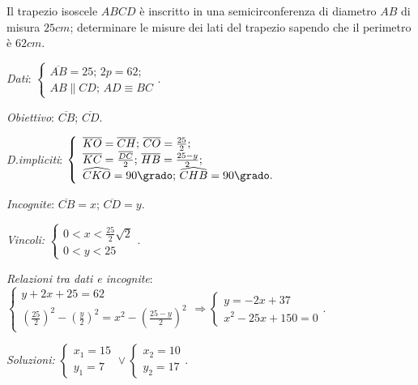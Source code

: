 \begin{problema}
Il trapezio isoscele $ABCD$ è inscritto in una semicirconferenza di diametro $AB$ di misura $25\unit{cm}$; determinare le misure dei lati del trapezio sapendo che il perimetro è $62\unit{cm}$.
\end{problema}
\begin{multicols}{2}
\emph{Dati}: $\left\{\begin{array}{l}\overline{AB}=25\text{; }2p=62;\\
AB\parallel CD\text{; }AD\equiv BC\end{array}\right.$.

\emph{Obiettivo}: $\overline{CB}$; $\overline{CD}$.

\emph{D.impliciti}: $\left\{\begin{array}{l}
\overline{KO}=\overline{CH}\text{; }\overline{CO}=\frac{25} 2;\\ \overline{KC}=\frac{\overline{DC}} 2\text{; }\overline{HB}=\frac{25-y} 2;\\ \widehat{CKO}=90\grado\text{; }\widehat{CHB}=90\grado.\end{array}\right.$

\emph{Incognite}: $\overline{CB}=x$; $\overline{CD}=y$.

\emph{Vincoli:} $\left\{\begin{array}{l}0<x<\frac{25} 2\sqrt 2\\0<y<25 \end{array}\right.$.
\begin{center}

\end{center}
\end{multicols}

\emph{Relazioni tra dati e incognite}:
$ \left\{\begin{array}{l}{y+2x+25=62}\\{\left(\frac{25} 2\right)^2-\left(\frac y 2\right)^2=x^2-\left(\frac{25-y} 2\right)^2}\end{array}\right. \Rightarrow \left\{\begin{array}{l}{y=-2x+37}\\{x^2-25x+150=0}\end{array}\right..$

\emph{Soluzioni:} $\left\{\begin{array}{l}{x_1=15}\\{y_1=7}\end{array}\right.\vee \left\{\begin{array}{l}{x_2=10}\\{y_2=17}\end{array}\right.$.


